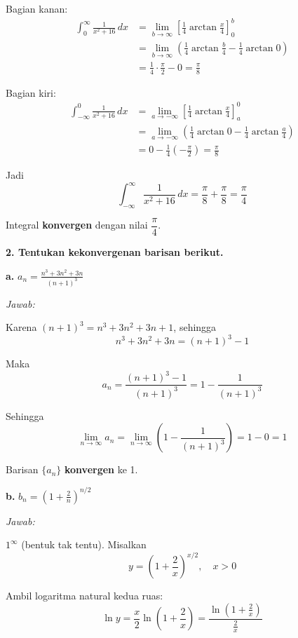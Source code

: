 \documentclass[12pt,a4paper]{article}
\begin{document}
Bagian kanan:
\begin{align*}
\int_{0}^{\infty} \frac{1}{x^2+16}\,dx
&= \lim_{b\to\infty} \left[\frac{1}{4}\arctan\frac{x}{4}\right]_{0}^{b} \\
&= \lim_{b\to\infty} \left(\frac{1}{4}\arctan\frac{b}{4} - \frac{1}{4}\arctan 0\right) \\
&= \frac{1}{4}\cdot\frac{\pi}{2} - 0 = \frac{\pi}{8}
\end{align*}

Bagian kiri:
\begin{align*}
\int_{-\infty}^{0} \frac{1}{x^2+16}\,dx
&= \lim_{a\to-\infty} \left[\frac{1}{4}\arctan\frac{x}{4}\right]_{a}^{0} \\
&= \lim_{a\to-\infty} \left(\frac{1}{4}\arctan 0 - \frac{1}{4}\arctan\frac{a}{4}\right) \\
&= 0 - \frac{1}{4}\left(-\frac{\pi}{2}\right) = \frac{\pi}{8}
\end{align*}

Jadi
\[
\int_{-\infty}^{\infty} \frac{1}{x^2+16}\,dx = \frac{\pi}{8} + \frac{\pi}{8} = \frac{\pi}{4}
\]

Integral \textbf{konvergen} dengan nilai $\dfrac{\pi}{4}$.

\vspace{6mm}
\textbf{2. Tentukan kekonvergenan barisan berikut.}

\textbf{a.} $\displaystyle a_n = \frac{n^3+3n^2+3n}{(n+1)^3}$

\textit{Jawab:}

Karena $(n+1)^3 = n^3+3n^2+3n+1$, sehingga
\[
n^3+3n^2+3n = (n+1)^3 - 1
\]

Maka
\[
a_n = \frac{(n+1)^3 - 1}{(n+1)^3} = 1 - \frac{1}{(n+1)^3}
\]

Sehingga
\[
\lim_{n\to\infty} a_n = \lim_{n\to\infty}\left(1 - \frac{1}{(n+1)^3}\right) = 1 - 0 = 1
\]

Barisan $\{a_n\}$ \textbf{konvergen} ke 1.

\vspace{4mm}
\textbf{b.} $\displaystyle b_n = \left(1+\frac{2}{n}\right)^{n/2}$

\textit{Jawab:}

$1^\infty$ (bentuk tak tentu). Misalkan
\[
y = \left(1+\frac{2}{x}\right)^{x/2}, \quad x > 0
\]

Ambil logaritma natural kedua ruas:
\[
\ln y = \frac{x}{2}\ln\left(1+\frac{2}{x}\right) = \frac{\ln\left(1+\frac{2}{x}\right)}{\frac{2}{x}}
\]
\end{document}
